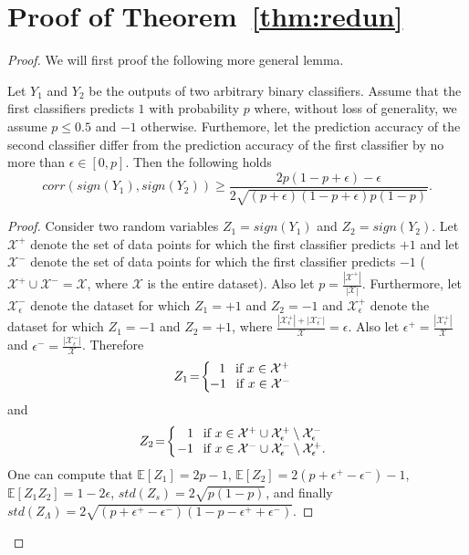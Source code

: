 \documentclass[twoside]{article}
\begin{document}
\section{Proof of Theorem~\ref{thm:redun}}
\begin{proof}
We will first proof the following more general lemma.
\begin{lemma}
Let $Y_1$ and $Y_2$ be the outputs of two arbitrary binary classifiers. Assume that the first classifiers predicts $1$ with probability $p$ where, without loss of generality, we assume $p \leq 0.5$ and $-1$ otherwise. Furthemore, let the prediction accuracy of the second classifier differ from the prediction accuracy of the first classifier by no more than $\epsilon \in [0,p]$. Then the following holds
\[corr(sign(Y_1),sign(Y_2)) \geq \frac{2p(1 \!-\! p \!+\! \epsilon) \!-\! \epsilon}{2\sqrt{(p \!+\! \epsilon)(1 \!-\! p \!+\! \epsilon)p(1 \!-\! p)}}.
\]
\end{lemma}
\begin{proof}
Consider two random variables $Z_1 = sign(Y_1)$ and $Z_2 = sign(Y_2)$. Let $\mathcal{X}^{+}$ denote the set of data points for which the first classifier predicts $+1$ and let $\mathcal{X}^{-}$ denote the set of data points for which the first classifier predicts $-1$ ($\mathcal{X}^{+} \cup \mathcal{X}^{-} = \mathcal{X}$, where $\mathcal{X}$ is the entire dataset). Also let $p = \frac{|\mathcal{X}^{+}|}{|\mathcal{X}|}$. Furthermore, let $\mathcal{X}_{\epsilon}^{-}$ denote the dataset for which $Z_1 = +1$ and $Z_2 = -1$ and $\mathcal{X}_{\epsilon}^{+}$ denote the dataset for which $Z_1 = -1$ and $Z_2 = +1$, where $\frac{|\mathcal{X}_{\epsilon}^{+}| + |\mathcal{X}_{\epsilon}^{-}|}{\mathcal{X}} = \epsilon$. Also let $\epsilon^{+} = \frac{|\mathcal{X}_{\epsilon}^{+}|}{\mathcal{X}}$ and $\epsilon^{-} = \frac{|\mathcal{X}_{\epsilon}^{-}|}{\mathcal{X}}$. Therefore
\[Z_1 \!=\! \left \{
  \begin{tabular}{c}
  $1$ \:\:if $x \in \mathcal{X}^{+}$\\
  \!\!\!\!$-1$ \:\:if $x \in \mathcal{X}^{-}$
  \end{tabular}
\right.
\]
and
\[Z_2 \!=\! \left \{
  \begin{tabular}{c}
  $1$ \:\:if $x \in \mathcal{X}^{+} \cup \mathcal{X}_{\epsilon}^{+}  \setminus \mathcal{X}_{\epsilon}^{-}$\\
  \!\!\!$-1$ \:\:if $x \in \mathcal{X}^{-} \cup \mathcal{X}_{\epsilon}^{-} \setminus \mathcal{X}_{\epsilon}^{+}$.
  \end{tabular}
\right.
\]
One can compute that $\mathbb{E}[Z_1] = 2p-1$, $\mathbb{E}[Z_2] = 2(p + \epsilon^{+} - \epsilon^{-}) - 1$, $\mathbb{E}[Z_1Z_2] = 1 - 2\epsilon$, $std(Z_s) = 2\sqrt{p(1-p)}$, and finally $std(Z_\Lambda) = 2\sqrt{(p + \epsilon^{+} - \epsilon^{-})(1 - p - \epsilon^{+} + \epsilon^{-})}$.

\end{proof}
\end{proof}
\end{document}
